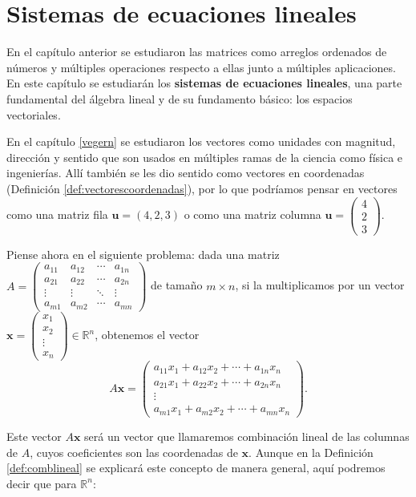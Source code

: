 \chapter{Sistemas de ecuaciones lineales}\label{sel}

En el capítulo anterior se estudiaron las matrices como arreglos ordenados de números y múltiples operaciones respecto a ellas junto a múltiples aplicaciones. En este capítulo se estudiarán los \textbf{sistemas de ecuaciones lineales}, una parte fundamental del álgebra lineal y de su fundamento básico: los espacios vectoriales.

En el capítulo \ref{vegern} se estudiaron los vectores como unidades con magnitud, dirección y sentido que son usados en múltiples ramas de la ciencia como física e ingenierías. Allí también se les dio sentido como vectores en coordenadas (Definición \ref{def:vectorescoordenadas}), por lo que podríamos pensar en vectores como una matriz fila $\mathbf{u}=(4,2,3)$ o como una matriz columna $\mathbf{u}=\begin{pmatrix}4\\2\\3\end{pmatrix}$. 

Piense ahora en el siguiente problema: dada una matriz $A=\begin{pmatrix}a_{11}&a_{12}&\cdots &a_{1n}\\a_{21}&a_{22}&\cdots &a_{2n}\\ \vdots&\vdots&\ddots &\vdots\\ a_{m1}&a_{m2}&\cdots &a_{mn}\end{pmatrix}$ de tamaño $m\times n$, si la multiplicamos por un vector $\mathbf{x}=\begin{pmatrix}x_1\\x_2\\\vdots\\ x_n \end{pmatrix} \in \mathbb{R}^n$, obtenemos el vector 
\begin{equation*}
A\mathbf{x} = \begin{pmatrix} a_{11}x_1+a_{12}x_2+\cdots + a_{1n}x_n\\a_{21}x_1+a_{22}x_2+\cdots + a_{2n}x_n\\\vdots \\ a_{m1}x_1+a_{m2}x_2+\cdots + a_{mn}x_n\end{pmatrix}.
\end{equation*}

Este vector $A\mathbf{x}$ será un vector que llamaremos combinación lineal de las columnas de $A$, cuyos coeficientes son las coordenadas de $\mathbf{x}$. Aunque en la Definición \ref{def:comblineal} se explicará este concepto de manera general, aquí podremos decir que para $\mathbb{R}^n$:

